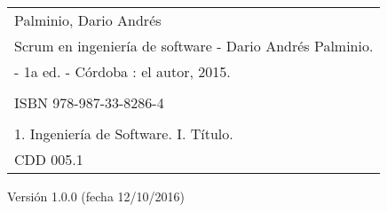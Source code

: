 
\newpage



\begin{table}
\centering
    \begin{tabular}{|l|}
    \hline
    {\small Palminio, Dario Andrés} \\   
    {\small Scrum en ingeniería de software - Dario Andrés Palminio.} \\ 
    {\small - 1a ed. -  Córdoba : el autor, 2015.}
         \\ \\   
         {\small ISBN 978-987-33-8286-4 } \\ \\   
         {\small 1. Ingeniería de Software. I. Título.}  \\   
         {\small CDD 005.1}  \\ \hline
    \end{tabular}
\end{table}


\begin{center}
Versión 1.0.0 (fecha 12/10/2016)
\end{center}


